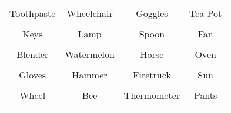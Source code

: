 \documentclass[12pt,a4paper]{article}
\begin{document}
\thispagestyle{empty}
\begin{table}[]
\centering
\Huge
\begin{tabular}{cccc}
 Toothpaste& Wheelchair& Goggles& Tea Pot\\  & & & \\
 Keys& Lamp& Spoon& Fan\\  & & & \\
 Blender& Watermelon& Horse& Oven\\  & & & \\
 Gloves& Hammer& Firetruck& Sun\\  & & & \\
 Wheel& Bee& Thermometer& Pants\\  & & & \\
\end{tabular}
\end{table}
\end{document}
